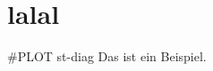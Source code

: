 \documentclass{article}
\begin{document}
\section{lalal}
#PLOT st-diag
Das ist ein Beispiel.
\end{document}
